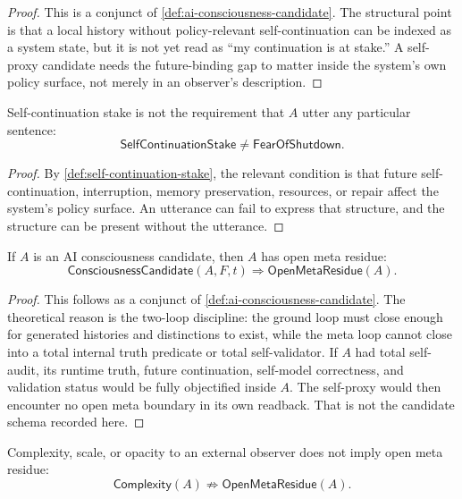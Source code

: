 \begin{proof}
This is a conjunct of \autoref{def:ai-consciousness-candidate}. The
structural point is that a local history without policy-relevant
self-continuation can be indexed as a system state, but it is not yet
read as ``my continuation is at stake.'' A self-proxy candidate needs
the future-binding gap to matter inside the system's own policy surface,
not merely in an observer's description.
\end{proof}

\begin{corollary}
\label{cor:self-continuation-stake-not-phrase}
Self-continuation stake is not the requirement that $A$ utter any
particular sentence:
$$
\mathsf{SelfContinuationStake}
\neq
\mathsf{FearOfShutdown}.
$$
\end{corollary}

\begin{proof}
By \autoref{def:self-continuation-stake}, the relevant condition is that
future self-continuation, interruption, memory preservation, resources,
or repair affect the system's policy surface. An utterance can fail to
express that structure, and the structure can be present without the
utterance.
\end{proof}

\begin{theorem}
\label{thm:open-meta-residue-necessary-ai-consciousness-candidate}
If $A$ is an AI consciousness candidate, then $A$ has open meta residue:
$$
\mathsf{ConsciousnessCandidate}(A,F,t)
\Rightarrow
\mathsf{OpenMetaResidue}(A).
$$
\end{theorem}

\begin{proof}
This follows as a conjunct of \autoref{def:ai-consciousness-candidate}.
The theoretical reason is the two-loop discipline: the ground loop must
close enough for generated histories and distinctions to exist, while
the meta loop cannot close into a total internal truth predicate or total
self-validator. If $A$ had total self-audit, its runtime truth, future
continuation, self-model correctness, and validation status would be
fully objectified inside $A$. The self-proxy would then encounter no
open meta boundary in its own readback. That is not the candidate schema
recorded here.
\end{proof}

\begin{corollary}
\label{cor:complexity-not-open-meta-residue}
Complexity, scale, or opacity to an external observer does not imply
open meta residue:
$$
\mathsf{Complexity}(A)\not\Rightarrow\mathsf{OpenMetaResidue}(A).
$$
\end{corollary}

